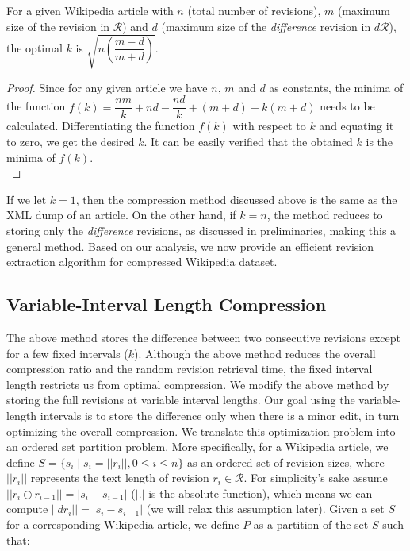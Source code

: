 \documentclass[acmsmall]{acmart}
\begin{document}
\begin{theorem}
For a given Wikipedia article with $n$ (total number of revisions), $m$ (maximum size of the revision in $\mathcal{R}$) and $d$ (maximum size of the \emph{difference} revision in $d\mathcal{R}$), the optimal $k$ is $\sqrt{n\left(\dfrac{m-d}{m+d}\right)}$.
\end{theorem}

\begin{proof}
Since for any given article we have $n$, $m$ and $d$ as constants, the minima of the function $f(k) = \dfrac{nm}{k} + nd - \dfrac{nd}{k} + (m+d) + k(m+d)$ needs to be calculated. Differentiating the function $f(k)$ with respect to $k$ and equating it to zero, we get the desired $k$. It can be easily verified that the obtained $k$ is the minima of $f(k)$.\\

\end{proof}

If we let $k = 1$, then the compression method discussed above is the same as the XML dump of an article. On the other hand, if $k = n$, the method reduces to storing only the \emph{difference} revisions, as discussed in preliminaries, making this a general method. Based on our analysis, we now provide an efficient revision extraction algorithm for compressed Wikipedia dataset. 

\subsection{Variable-Interval Length Compression}
The above method stores the difference between two consecutive revisions except for a few fixed intervals ($k$). Although the above method reduces the overall compression ratio and the random revision retrieval time, the fixed interval length restricts us from optimal compression. We modify the above method by storing the full revisions at variable interval lengths. Our goal using the variable-length intervals is to store the difference only when there is a minor edit, in turn optimizing the overall compression. We translate this optimization problem into an ordered set partition problem. More specifically, for a Wikipedia article, we define $S = \{s_i \mid s_i = ||r_i||, 0 \leq i \leq n \}$ as an ordered set of revision sizes, where $||r_i||$ represents the text length of revision $r_i \in \mathcal{R}$. For simplicity's sake assume $||r_{i} \ominus r_{i-1}|| = |s_i - s_{i-1}|$ ($|.|$ is the absolute function), which means we can compute $||dr_{i}|| = |s_i - s_{i-1}|$ (we will relax this assumption later). Given a set $S$ for a corresponding Wikipedia article, we define $P$ as a partition of the set $S$ such that:
\end{document}
